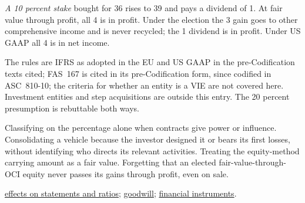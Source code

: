 \begin{qfdefinition}
\emph{A 10 percent stake} bought for 36 rises to 39 and pays a dividend of 1. At fair value through profit, all 4 is in profit. Under the election the 3 gain goes to other comprehensive income and is never recycled; the 1 dividend is in profit. Under US GAAP all 4 is in net income.

 The rules are IFRS as adopted in the EU and US GAAP in the pre-Codification texts cited; FAS~167 is cited in its pre-Codification form, since codified in ASC~810-10; the criteria for whether an entity is a VIE are not covered here. Investment entities and step acquisitions are outside this entry. The 20 percent presumption is rebuttable both ways.

 Classifying on the percentage alone when contracts give power or influence. Consolidating a vehicle because the investor designed it or bears its first losses, without identifying who directs its relevant activities. Treating the equity-method carrying amount as a fair value. Forgetting that an elected fair-value-through-OCI equity never passes its gains through profit, even on sale.

 \hyperref[meth:consolidation-ratio-effects]{effects on statements and ratios}; \hyperref[meth:intangibles-goodwill-reporting]{goodwill}; \hyperref[meth:financial-instruments-liabilities]{financial instruments}.

\end{qfdefinition}

